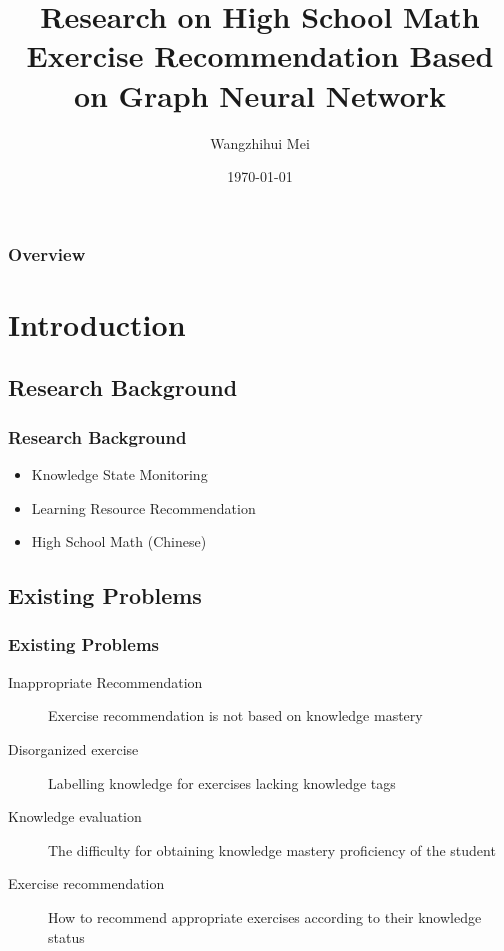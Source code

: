 \documentclass{beamer}
\title[Exercise Recommendation]{Research on High School Math Exercise Recommendation Based on Graph Neural Network} %
\author{Wangzhihui Mei} %
\institute[UOW] 
{
University of Wollongong \\ %
\medskip
\textit{maywzh@gmail.com} %
}
\date{\today} %
\begin{document}
\begin{frame}
  \titlepage %
\end{frame}

\begin{frame}
  \frametitle{Overview} %
  \tableofcontents %
\end{frame}


\section{Introduction}
\subsection{Research Background}
\begin{frame}
  \frametitle{Research Background}
  \begin{itemize}
    \item Knowledge State Monitoring
    \item Learning Resource Recommendation
    \item High School Math (Chinese)
  \end{itemize}
\end{frame}

\subsection{Existing Problems}
\begin{frame}
  \frametitle{Existing Problems}
  \begin{description}
    \item[Inappropriate Recommendation] Exercise recommendation is not based on knowledge mastery
    \item[Disorganized exercise] Labelling knowledge for exercises lacking knowledge tags
    \item[Knowledge evaluation] The difficulty for obtaining knowledge mastery proficiency of the student
    \item[Exercise recommendation] How to recommend appropriate exercises according to their knowledge status
  \end{description}
\end{frame}
\end{document}
